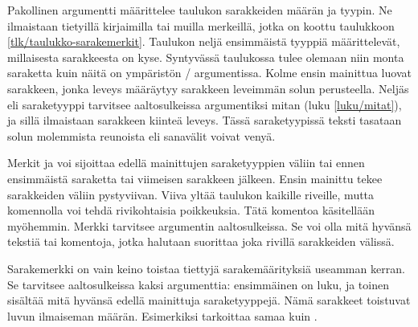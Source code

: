 Pakollinen argumentti  määrittelee taulukon sarakkeiden
määrän ja tyypin. Ne ilmaistaan tietyillä kirjaimilla tai muilla
merkeillä, jotka on koottu taulukkoon \ref{tlk/taulukko-sarakemerkit}.
Taulukon neljä ensimmäistä tyyppiä  määrittelevät,
millaisesta sarakkeesta on kyse. Syntyvässä taulukossa tulee olemaan
niin monta saraketta kuin näitä on ympäristön \-/
argumentissa. Kolme ensin mainittua luovat sarakkeen, jonka leveys
määräytyy sarakkeen leveimmän solun perusteella. Neljäs eli saraketyyppi
 tarvitsee aaltosulkeissa argumentiksi mitan (luku
\ref{luku/mitat}), ja sillä ilmaistaan sarakkeen kiinteä leveys. Tässä
saraketyypissä teksti tasataan solun molemmista reunoista eli sanavälit
voivat venyä.

Merkit \koodi{|} ja  voi sijoittaa edellä mainittujen
saraketyyppien väliin tai ennen ensimmäistä saraketta tai viimeisen
sarakkeen jälkeen. Ensin mainittu tekee sarakkeiden väliin pystyviivan.
Viiva yltää taulukon kaikille riveille, mutta komennolla
 voi tehdä rivikohtaisia poikkeuksia. Tätä komentoa
käsitellään myöhemmin. Merkki  tarvitsee argumentin
aaltosulkeissa. Se voi olla mitä hyvänsä tekstiä tai komentoja, jotka
halutaan suorittaa joka rivillä sarakkeiden välissä.

Sarakemerkki \koodi{*} on vain keino toistaa tiettyjä sarakemäärityksiä
useamman kerran. Se tarvitsee aaltosulkeissa kaksi argumenttia:
ensimmäinen on luku, ja toinen sisältää mitä hyvänsä edellä mainittuja
saraketyyppejä. Nämä sarakkeet toistuvat luvun ilmaiseman määrän.
Esimerkiksi  tarkoittaa samaa kuin
.

